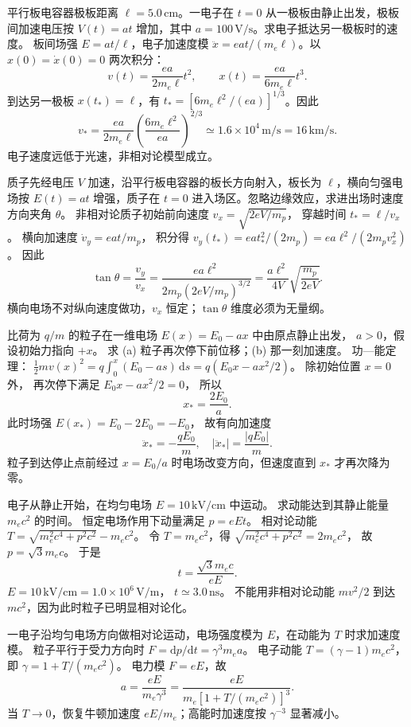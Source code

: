 平行板电容器极板距离 $\ell=5.0\,\mathrm{cm}$。一电子在 $t=0$ 从一极板由静止出发，极板间加速电压按 $V(t)=at$ 增加，其中 $a=100\,\mathrm{V/s}$。求电子抵达另一极板时的速度。
\exsolution
板间场强 $E=at/\ell$，电子加速度模
$\ddot x=eat/(m_e\ell)$。以 $x(0)=\dot x(0)=0$ 两次积分：
\[
v(t)=\frac{ea}{2m_e\ell}t^2,\qquad
x(t)=\frac{ea}{6m_e\ell}t^3.
\]
到达另一极板 $x(t_*)=\ell$，有
$t_*=[6m_e\ell^2/(ea)]^{1/3}$。因此
\[
\boxed{v_*=\frac{ea}{2m_e\ell}
\left(\frac{6m_e\ell^2}{ea}\right)^{2/3}
\simeq1.6\times10^4\,\mathrm{m/s}=16\,\mathrm{km/s}}.
\]
\excheck 电子速度远低于光速，非相对论模型成立。

质子先经电压 $V$ 加速，沿平行板电容器的板长方向射入，板长为 $\ell$，横向匀强电场按 $E(t)=at$ 增强，质子在 $t=0$ 进入场区。忽略边缘效应，求进出场时速度方向夹角 $\theta$。
\exsolution
非相对论质子初始前向速度
$v_x=\sqrt{2eV/m_p}$，
穿越时间 $t_*=\ell/v_x$。
横向加速度
$\dot v_y=ea t/m_p$，
积分得
$v_y(t_*)=ea t_*^2/(2m_p)
=ea\ell^2/(2m_pv_x^2)$。
因此
\[
\boxed{\tan\theta=\frac{v_y}{v_x}
=\frac{ea\ell^2}{2m_p(2eV/m_p)^{3/2}}
=\frac{a\ell^2}{4V}\sqrt{\frac{m_p}{2eV}}}.
\]
\excheck 横向电场不对纵向速度做功，$v_x$ 恒定；$\tan\theta$ 维度必须为无量纲。

比荷为 $q/m$ 的粒子在一维电场
$E(x)=E_0-ax$ 中由原点静止出发，
$a>0$，假设初始力指向 $+x$。
求 (a) 粒子再次停下前位移；(b) 那一刻加速度。
\exsolution
功—能定理：
$\frac12mv(x)^2=q\int_0^x(E_0-as)\,\mathrm ds
=q(E_0x-ax^2/2)$。
除初始位置 $x=0$ 外，
再次停下满足
$E_0x-ax^2/2=0$，
所以
\[
\boxed{x_*=\frac{2E_0}{a}}.
\]
此时场强
$E(x_*)=E_0-2E_0=-E_0$，
故有向加速度
\[
\boxed{\ddot x_*=-\frac{qE_0}{m}},
\quad |\ddot x_*|=\frac{|qE_0|}{m}.
\]
\excheck 粒子到达停止点前经过 $x=E_0/a$ 时电场改变方向，但速度直到 $x_*$ 才再次降为零。

电子从静止开始，在均匀电场
$E=10\,\mathrm{kV/cm}$ 中运动。
求动能达到其静止能量 $m_ec^2$ 的时间。
\exsolution
恒定电场作用下动量满足
$p=eEt$。
相对论动能
$T=\sqrt{m_e^2c^4+p^2c^2}-m_ec^2$。
令 $T=m_ec^2$，得
$\sqrt{m_e^2c^4+p^2c^2}=2m_ec^2$，
故 $p=\sqrt3m_ec$。
于是
\[
\boxed{t=\frac{\sqrt3m_ec}{eE}}.
\]
$E=10\,\mathrm{kV/cm}=1.0\times10^6\,\mathrm{V/m}$，
$\boxed{t\simeq3.0\,\mathrm{ns}}$。
\excheck 不能用非相对论动能 $mv^2/2$ 到达 $mc^2$，因为此时粒子已明显相对论化。

一电子沿均匀电场方向做相对论运动，电场强度模为 $E$，在动能为 $T$ 时求加速度模。
\exsolution
粒子平行于受力方向时
$F=\mathrm dp/\mathrm dt=\gamma^3m_e a$。
电子动能
$T=(\gamma-1)m_ec^2$，即
$\gamma=1+T/(m_ec^2)$。
电力模 $F=eE$，故
\[
\boxed{a=\frac{eE}{m_e\gamma^3}
=\frac{eE}{m_e[1+T/(m_ec^2)]^3}}.
\]
\excheck 当 $T\to0$，恢复牛顿加速度 $eE/m_e$；高能时加速度按 $\gamma^{-3}$ 显著减小。

